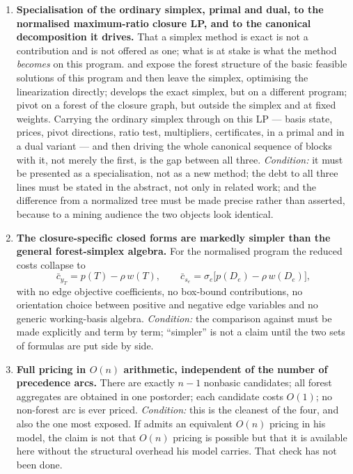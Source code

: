 \begin{enumerate}[label=C\arabic*.,leftmargin=*]
\item \textbf{Specialisation of the ordinary simplex, primal and dual, to the
      normalised maximum-ratio closure LP, and to the canonical decomposition
      it drives.} That a simplex method is exact is not a contribution and is
      not offered as one; what is at stake is what the method \emph{becomes}
      on this program. \citet{Wuille2025} and
      \citet{MollakhaniEtAl2026} expose the forest structure of the basic
      feasible solutions of this program and then leave the simplex, optimising
      the linearization directly; \citet{Yang2026} develops the exact simplex,
      but on a different program; \citet{LerchsGrossmann1965} pivot on a forest
      of the closure graph, but outside the simplex and at fixed weights.
      Carrying the ordinary simplex through on this LP --- basis state, prices,
      pivot directions, ratio test, multipliers, certificates, in a primal and
      in a dual variant --- and then driving the whole canonical sequence of
      blocks with it, not merely the first, is the gap between all three.
      \emph{Condition:} it must be presented as a specialisation, not as a new
      method; the debt to all three lines must be stated in the abstract, not
      only in related work; and the difference from a normalized tree must be
      made precise rather than asserted, because to a mining audience the two
      objects look identical.

\item \textbf{The closure-specific closed forms are markedly simpler than the
      general forest-simplex algebra.} For the normalised program the reduced
      costs collapse to
      \[
        \bar c_{y_T} = p(T) - \rho\,w(T),
        \qquad
        \bar c_{s_e} = \sigma_e\bigl[p(D_e) - \rho\,w(D_e)\bigr],
      \]
      with no edge objective coefficients, no box-bound contributions, no
      orientation choice between positive and negative edge variables and no
      generic working-basis algebra. \emph{Condition:} the comparison against
      \citet{Yang2026} must be made explicitly and term by term; ``simpler''
      is not a claim until the two sets of formulas are put side by side.

\item \textbf{Full pricing in $O(n)$ arithmetic, independent of the number of
      precedence arcs.} There are exactly $n-1$ nonbasic candidates; all forest
      aggregates are obtained in one postorder; each candidate costs $O(1)$; no
      non-forest arc is ever priced. \emph{Condition:} this is the cleanest of
      the four, and also the one most exposed. If \citet{Yang2026} admits an
      equivalent $O(n)$ pricing in his model, the claim is not that $O(n)$
      pricing is possible but that it is available here without the structural
      overhead his model carries. That check has not been done.


\end{enumerate}
